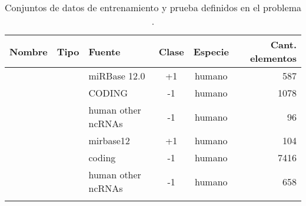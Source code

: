 \begin{table}[h]
  \tableStyle
  \begin{tabular}{lllScr}
    \toprule
    Nombre & Tipo & Fuente & {Clase} & Especie & Cant. elementos \\
    \midrule
     & 
    &  miRBase 12.0       & +1    & humano    & 587              \\
    && CODING             & -1    & humano    & 1078             \\
    && human other ncRNAs & -1    & humano    & 96               \\
    \midrule
     & 
    &  mirbase12          & +1    & humano    & 104              \\
    && coding             & -1    & humano    & 7416             \\
    && human other ncRNAs & -1    & humano    & 658              \\
    \bottomrule
    \\
  \end{tabular}
  \caption{\captionStyle Conjuntos de datos de entrenamiento y prueba
    definidos en el problema .}
  \label{tbl:problembtw}

\end{table}